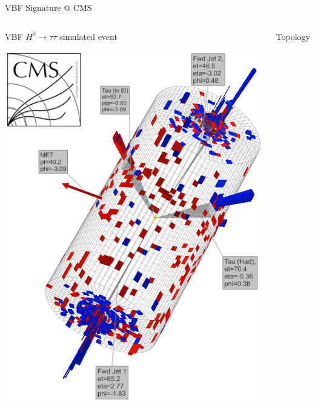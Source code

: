 \documentclass[8pt]{beamer}
\begin{document}
\begin{frame}{VBF Signature @ CMS}

  \begin{columns}

    \column[t]{5.0cm}
    \begin{block}{VBF $H^0 \rightarrow \tau \tau$ simulated event}

      \begin{center}
        \includegraphics[width=1.00\textwidth]{img/EventDisplay_VBF_HToTauTau_El-Had.png} 
      \end{center}

    \end{block}

    \column[t]{6.5cm}
    \begin{block}{Topology}
      

\end{block}
\end{columns}
\end{frame}
\end{document}
